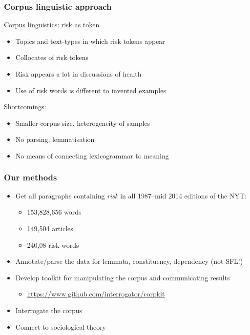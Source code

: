\documentclass{beamer}       %
\begin{document}
\begin{frame}
    \frametitle{Corpus linguistic approach}

    Corpus linguistics: risk as token \cite{hamilton_meanings_2007}

    \begin{itemize}
    \item Topics and text-types in which risk tokens appear
    \item Collocates of risk tokens \cite{hamilton_meanings_2007}
    \item Risk appears a lot in discussions of health
    \item Use of risk words is different to invented examples
    \end{itemize}

    Shortcomings:

    \begin{itemize}
        \item Smaller corpus size, heterogeneity of samples
        \item No parsing, lemmatisation
        \item No means of connecting lexicogrammar to meaning
    \end{itemize}

\end{frame}


\begin{frame}
    \frametitle{Our methods}
    
    \begin{itemize}
    \item Get all paragraphs containing \emph{risk} in all 1987--mid 2014 editions of the NYT:
    \begin{itemize}
    \item 153,828,656 words
    \item 149,504 articles
    \item 240,08 risk words
    \end{itemize}
    \item Annotate\slash parse the data for lemmata, constituency, dependency (not SFL!)
    \item Develop toolkit for manipulating the corpus and communicating results
    \begin{itemize}
        \item \url{https://www.github.com/interrogator/corpkit}
    \end{itemize}
    \item Interrogate the corpus
    \item Connect to sociological theory
    \end{itemize}
\end{frame}
\end{document}
